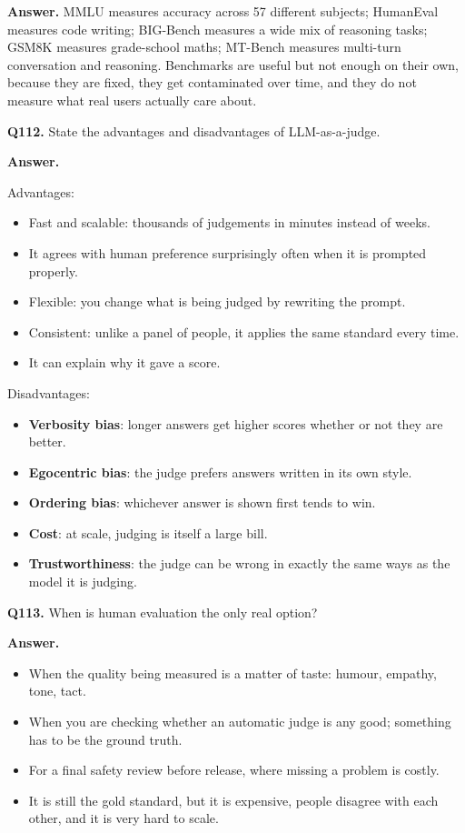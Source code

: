 \documentclass[11pt]{article}
\begin{document}
\textbf{Answer.} MMLU measures accuracy across 57 different subjects; HumanEval measures code
writing; BIG-Bench measures a wide mix of reasoning tasks; GSM8K measures grade-school maths;
MT-Bench measures multi-turn conversation and reasoning. Benchmarks are useful but not enough
on their own, because they are fixed, they get contaminated over time, and they do not measure
what real users actually care about.

\medskip
\textbf{Q112.} State the advantages and disadvantages of LLM-as-a-judge.

\textbf{Answer.}

Advantages:
\begin{itemize}
  \item Fast and scalable: thousands of judgements in minutes instead of weeks.
  \item It agrees with human preference surprisingly often when it is prompted properly.
  \item Flexible: you change what is being judged by rewriting the prompt.
  \item Consistent: unlike a panel of people, it applies the same standard every time.
  \item It can explain why it gave a score.
\end{itemize}

Disadvantages:
\begin{itemize}
  \item \textbf{Verbosity bias}: longer answers get higher scores whether or not they are better.
  \item \textbf{Egocentric bias}: the judge prefers answers written in its own style.
  \item \textbf{Ordering bias}: whichever answer is shown first tends to win.
  \item \textbf{Cost}: at scale, judging is itself a large bill.
  \item \textbf{Trustworthiness}: the judge can be wrong in exactly the same ways as the model it is judging.
\end{itemize}

\medskip
\textbf{Q113.} When is human evaluation the only real option?

\textbf{Answer.}
\begin{itemize}
  \item When the quality being measured is a matter of taste: humour, empathy, tone, tact.
  \item When you are checking whether an automatic judge is any good; something has to be the ground truth.
  \item For a final safety review before release, where missing a problem is costly.
  \item It is still the gold standard, but it is expensive, people disagree with each other, and it is very hard to scale.
\end{itemize}
\end{document}
